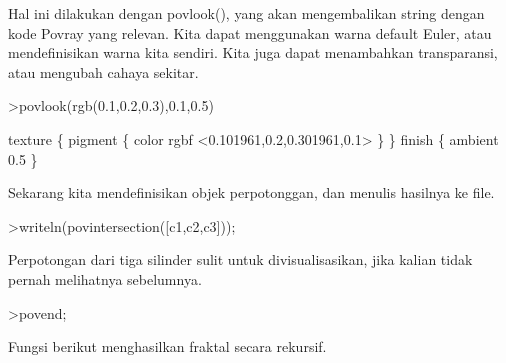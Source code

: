 \documentclass{article}
\begin{document}
\begin{eulernotebook}
\begin{eulercomment}
Hal ini dilakukan dengan povlook(), yang akan mengembalikan string
dengan kode Povray yang relevan. Kita dapat menggunakan warna default
Euler, atau mendefinisikan warna kita sendiri. Kita juga dapat
menambahkan transparansi, atau mengubah cahaya sekitar.
\end{eulercomment}
\begin{eulerprompt}
>povlook(rgb(0.1,0.2,0.3),0.1,0.5)
\end{eulerprompt}
\begin{euleroutput}
   texture \{ pigment \{ color rgbf <0.101961,0.2,0.301961,0.1> \}  \} 
   finish \{ ambient 0.5 \} 
  
\end{euleroutput}
\begin{eulercomment}
Sekarang kita mendefinisikan objek perpotonggan, dan menulis hasilnya
ke file.
\end{eulercomment}
\begin{eulerprompt}
>writeln(povintersection([c1,c2,c3]));
\end{eulerprompt}
\begin{eulercomment}
Perpotongan dari tiga silinder sulit untuk divisualisasikan, jika
kalian tidak pernah melihatnya sebelumnya.
\end{eulercomment}
\begin{eulerprompt}
>povend;
\end{eulerprompt}
\begin{eulercomment}
Fungsi berikut menghasilkan fraktal secara rekursif.


\end{eulercomment}
\end{eulernotebook}
\end{document}
